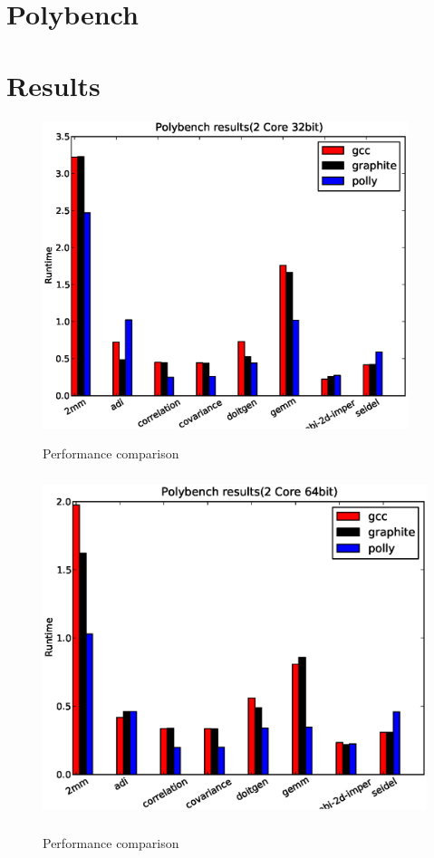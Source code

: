 \label{chap:testing}
\section{Polybench}

\section{Results}

\begin{figure}
\begin{center}
  \label{fig:2core1}
  \includegraphics[height=9cm]{images/2core32bit.eps}
  \caption{Performance comparison}
\end{center}
\end{figure}

\begin{figure}
\begin{center}
  \label{fig:2core2}
  \includegraphics[height=10cm]{images/2core64bit.eps}
  \caption{Performance comparison}
\end{center}
\end{figure}

